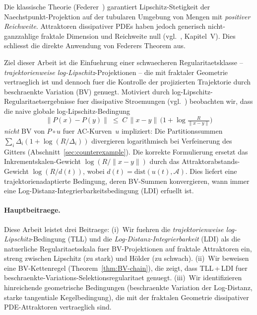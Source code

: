 \documentclass[12pt,a4paper]{article}
\theoremstyle{definition}
\theoremstyle{plain}
\theoremstyle{remark}
\newcommand{\dist}{\mathrm{dist}}
\begin{document}
Die klassische Theorie (Federer~\cite{Federer1959}) garantiert
Lipschitz-Stetigkeit der Naechstpunkt-Projektion auf der tubularen
Umgebung von Mengen mit \emph{positiver Reichweite}.  Attraktoren
dissipativer PDEs haben jedoch generisch nicht-ganzzahlige fraktale
Dimension und Reichweite null
(vgl.~\cite{Temam1997}, Kapitel~V).  Dies schliesst die direkte
Anwendung von Federers Theorem aus.

Ziel dieser Arbeit ist die Einfuehrung einer schwaecheren
Regularitaetsklasse -- \emph{trajektorienweise log-Lipschitz}-Projektionen
-- die mit fraktaler Geometrie vertraeglich ist und dennoch fuer die
Kontrolle der projizierten Trajektorie durch beschraenkte Variation (BV)
genuegt.  Motiviert durch log-Lipschitz-Regularitaetsergebnisse fuer
dissipative Stroemungen
(vgl.~\cite{BarbuCannone2016}) beobachten wir, dass die naive globale
log-Lipschitz-Bedingung
\begin{equation}\label{eq:global-LL-intro}
  \|P(x) - P(y)\|
  \;\le\;
  C\,\|x-y\|\,\bigl(1 + \log\tfrac{R}{\|x-y\|}\bigr)
\end{equation}
\emph{nicht} BV von $P \circ u$ fuer AC-Kurven~$u$ impliziert: Die
Partitionssummen $\sum_i \Delta_i(1+\log(R/\Delta_i))$ divergieren
logarithmisch bei Verfeinerung des Gitters
(Abschnitt~\ref{sec:counterexample}).  Die korrekte Formulierung
ersetzt das Inkrementskalen-Gewicht $\log(R/\|x-y\|)$ durch das
Attraktorabstands-Gewicht $\log(R/d(t))$, wobei
$d(t) = \dist(u(t),\mathcal{A})$.  Dies liefert eine
trajektorienadaptierte Bedingung, deren BV-Summen konvergieren,
wann immer eine Log-Distanz-Integrierbarkeitsbedingung (LDI) erfuellt ist.


\paragraph{Hauptbeitraege.}
Diese Arbeit leistet drei Beitraege: (i)~Wir fuehren die \emph{trajektorienweise log-Lipschitz}-Bedingung (TLL) und die \emph{Log-Distanz-Integrierbarkeit} (LDI) als die natuerliche Regularitaetsskala fuer BV-Projektionen auf fraktale Attraktoren ein, streng zwischen Lipschitz (zu stark) und H\"older (zu schwach). (ii)~Wir beweisen eine BV-Kettenregel (Theorem~\ref{thm:BV-chain}), die zeigt, dass TLL\,+\,LDI fuer beschraenkte-Variations-Selektionsregularitaet genuegt. (iii)~Wir identifizieren hinreichende geometrische Bedingungen (beschraenkte Variation der Log-Distanz, starke tangentiale Kegelbedingung), die mit der fraktalen Geometrie dissipativer PDE-Attraktoren vertraeglich sind.
\end{document}
